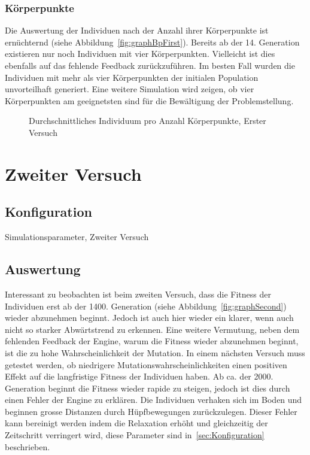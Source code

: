     \subsubsection{Körperpunkte\label{subsub:bp}}

      Die Auswertung der Individuen nach der Anzahl ihrer Körperpunkte ist ernüchternd (siehe Abbildung~\vref{fig:graphBpFirst}).
      Bereits ab der 14. Generation existieren nur noch Individuen mit vier Körperpunkten.
      Vielleicht ist dies ebenfalls auf das fehlende Feedback zurückzuführen.
      Im besten Fall wurden die Individuen mit mehr als vier Körperpunkten der initialen Population unvorteilhaft generiert.
      Eine weitere Simulation wird zeigen,
      ob vier Körperpunkten am geeignetsten sind für die Bewältigung der Problemstellung.

      \begin{figure}
        \centering
        
        \caption{Durchschnittliches Individuum pro Anzahl Körperpunkte, Erster Versuch\label{fig:graphBpFirst}}
      \end{figure}

  \section{Zweiter Versuch}

    \subsection{Konfiguration}

      \begin{table}[H]
        \centering
        
        \caption{Simulationsparameter, Zweiter Versuch}
      \end{table}

    \subsection{Auswertung\label{sub:scndAuswertung}}

      Interessant zu beobachten ist beim zweiten Versuch,
      dass die Fitness der Individuen erst ab der 1400\@. Generation (siehe Abbildung~\vref{fig:graphSecond})
      wieder abzunehmen beginnt.
      Jedoch ist auch hier wieder ein klarer, wenn auch nicht so starker Abwärtstrend zu erkennen.
      Eine weitere Vermutung, neben dem fehlenden Feedback der Engine, warum die Fitness wieder abzunehmen beginnt,
      ist die zu hohe Wahrscheinlichkeit der Mutation.
      In einem nächsten Versuch muss getestet werden,
      ob niedrigere Mutationswahrscheinlichkeiten einen positiven Effekt auf die langfristige Fitness der Individuen haben.
      Ab ca\@. der 2000\@. Generation beginnt die Fitness wieder rapide zu steigen,
      jedoch ist dies durch einen Fehler der Engine zu erklären.
      Die Individuen verhaken sich im Boden und beginnen grosse Distanzen durch Hüpfbewegungen zurückzulegen.
      Dieser Fehler kann bereinigt werden indem die Relaxation erhöht und gleichzeitig der Zeitschritt verringert wird,
      diese Parameter sind in~\vref{sec:Konfiguration} beschrieben.


